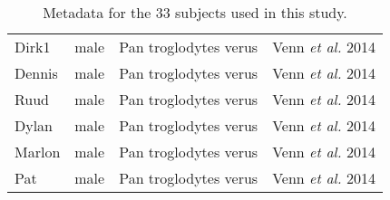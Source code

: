 \begin{table}[h]
\begin{tabular}{|l|l|l|l|}
Dirk1  &  male  &  Pan troglodytes verus  & Venn \textit{et al.} 2014\cite{Venn1272}  \\
Dennis  &  male  &  Pan troglodytes verus  & Venn \textit{et al.} 2014\cite{Venn1272}  \\
Ruud  &  male  &  Pan troglodytes verus  & Venn \textit{et al.} 2014\cite{Venn1272}  \\
Dylan  &  male  &  Pan troglodytes verus  & Venn \textit{et al.} 2014\cite{Venn1272}  \\
Marlon  &  male  &  Pan troglodytes verus  & Venn \textit{et al.} 2014\cite{Venn1272}  \\
Pat  &  male  &  Pan troglodytes verus  & Venn \textit{et al.} 2014\cite{Venn1272} \\
\hline

\end{tabular}
\caption{\label{tab:subjects}Metadata for the 33 subjects used in this study.}
\end{table}









